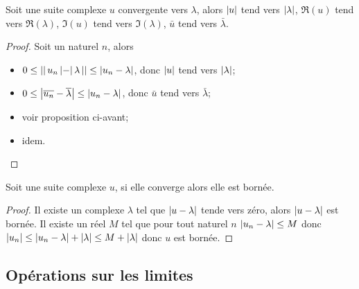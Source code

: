 \begin{prop}
  Soit une suite complexe $u$ convergente vers $\lambda$, alors $\left\lvert u\right\rvert$ tend vers $\left\lvert\lambda\right\rvert$, $\Re(u)$ tend vers $\Re(\lambda)$, $\Im(u)$ tend vers $\Im(\lambda)$, $\bar{u}$ tend vers $\bar{\lambda}$.
\end{prop}
\begin{proof}
  Soit un naturel $n$, alors 
  \begin{itemize}
  \item $0 \leq \left\lvert\right\rvert u_n\left\lvert-\right\rvert\lambda\left\lvert\right\rvert \leq \left\lvert u_n - \lambda\right\rvert$, donc $\left\lvert u\right\rvert$ tend vers $\left\lvert\lambda\right\rvert$;
  \item $0 \leq \left\lvert\overline{u_n} - \overline{\lambda}\right\rvert\leq \left\lvert u_n - \lambda\right\rvert$, donc $\bar{u}$ tend vers $\bar{\lambda}$;
  \item voir proposition ci-avant;
  \item idem.
  \end{itemize}
\end{proof}
\begin{prop}
  Soit une suite complexe $u$, si elle converge alors elle est bornée.
\end{prop}
\begin{proof}
  Il existe un complexe $\lambda$  tel que $\left\lvert u-\lambda\right\rvert$ tende vers zéro, alors $\left\lvert u-\lambda\right\rvert$ est bornée. Il existe un réel $M$ tel que pour tout naturel $n$ $\left\lvert u_n-\lambda\right\rvert \leq M$ donc $\left\lvert u_n\right\rvert \leq \left\lvert u_n-\lambda\right\rvert+\left\lvert\lambda\right\rvert \leq M+\left\lvert\lambda\right\rvert$ donc $u$ est bornée.
\end{proof}

\subsection{Opérations sur les limites}

